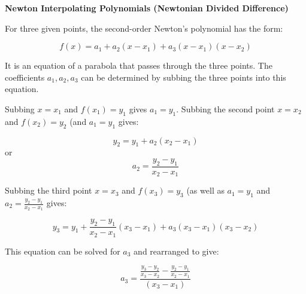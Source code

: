 \documentclass{article}
\begin{document}
\textbf{Newton Interpolating Polynomials (Newtonian Divided Difference)}

For three given points, the second-order Newton's polynomial has the form:

\[f(x) = a_1 + a_2(x-x_1) + a_3(x - x_1)(x - x_2)\]

It is an equation of a parabola that passes through the three points. The coefficients $a_1, a_2, a_3$ can be determined by subbing the three points into this equation.

Subbing $x = x_1$ and $f(x_1) = y_1$ gives $a_1 = y_1$. Subbing the second point $x = x_2$ and $f(x_2) = y_2$ (and $a_1 = y_1$ gives:

\[ y_2 = y_1 + a_2(x_2 - x_1)\]
or
\[a_2 = \frac{y_2 - y_1}{x_2-x_1}\]

Subbing the third point $x = x_3$ and $f(x_3) = y_3$ (as well as $a_1 = y_1$ and $a_2 = \frac{y_2-y_1}{x_2-x_1}$ gives:

\[y_3 = y_1 + \frac{y_2-y_1}{x_2-x_1}(x_3-x_1) + a_3(x_3-x_1)(x_3-x_2)\]

This equation can be solved for $a_3$ and rearranged to give:

\[a_3 = \frac{\frac{y_3-y_2}{x_3-x_2} - \frac{y_2-y_1}{x_2-x_1}}{(x_3-x_1)}\]
\end{document}

